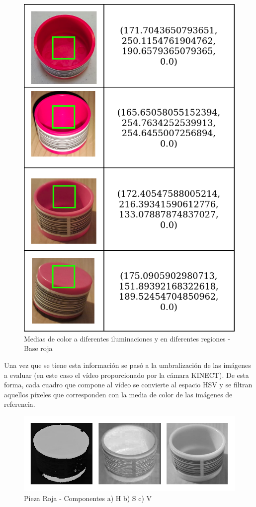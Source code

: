 \begin{figure}[ht]
\centering
\includegraphics[scale= 0.35]{Figures/Tabla_Medias_Ilum.png}
    \caption{Medias de color a diferentes iluminaciones y en diferentes regiones - Base roja}
    \label{fig:RedPiece_MeanHSV}
\end{figure}

Una vez que se tiene esta información se pasó a la umbralización de las imágenes a evaluar (en este caso el vídeo proporcionado por la cámara KINECT). De esta forma, cada cuadro que compone al vídeo se convierte al espacio HSV y se filtran aquellos píxeles que corresponden con la media de color de las imágenes de referencia. 

\begin{figure}[ht]
\centering
\includegraphics[scale= 0.3]{Figures/RedPiece_HSV_components.png}
    \caption{Pieza Roja - Componentes a) H b) S c) V}
    \label{fig:RedPiece_HSV}
\end{figure}

